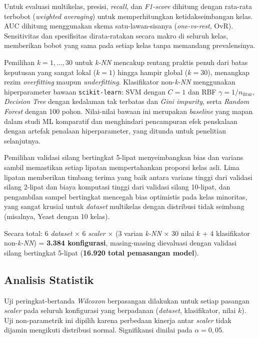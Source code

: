 \documentclass[12pt,a4paper]{article}
\begin{document}
Untuk evaluasi multikelas, presisi, \textit{recall}, dan \textit{F1-score}
dihitung dengan rata-rata terbobot (\textit{weighted averaging}) untuk
memperhitungkan ketidakseimbangan kelas. AUC dihitung menggunakan skema
satu-lawan-sisanya (\textit{one-vs-rest}, OvR). Sensitivitas dan spesifisitas
dirata-ratakan secara makro di seluruh kelas, memberikan bobot yang sama pada
setiap kelas tanpa memandang prevalensinya.

Pemilihan $k=1,\dots,30$ untuk \textit{k-NN} mencakup rentang praktis penuh
dari batas keputusan yang sangat lokal ($k=1$) hingga hampir global ($k=30$),
menangkap rezim \textit{overfitting} maupun \textit{underfitting}. Klasifikator
non-\textit{k-NN} menggunakan hiperparameter bawaan \texttt{scikit-learn}:
SVM dengan $C=1$ dan RBF $\gamma=1/n_{\text{fitur}}$, \textit{Decision Tree}
dengan kedalaman tak terbatas dan \textit{Gini impurity}, serta \textit{Random
Forest} dengan 100 pohon. Nilai-nilai bawaan ini merupakan \textit{baseline}
yang mapan dalam studi ML komparatif dan menghindari pencampuran efek
penskalaan dengan artefak penalaan hiperparameter, yang ditunda untuk
penelitian selanjutnya.

Pemilihan validasi silang bertingkat 5-lipat menyeimbangkan bias dan varians
sambil memastikan setiap lipatan mempertahankan proporsi kelas asli. Lima
lipatan memberikan timbang terima yang baik antara varians tinggi dari validasi
silang 2-lipat dan biaya komputasi tinggi dari validasi silang 10-lipat, dan
pengambilan sampel bertingkat mencegah bias optimistis pada kelas minoritas,
yang sangat krusial untuk \textit{dataset} multikelas dengan distribusi tidak
seimbang (misalnya, Yeast dengan 10 kelas).

Secara total: 6 \textit{dataset} $\times$ 6 \textit{scaler} $\times$
(3 varian \textit{k-NN} $\times$ 30 nilai $k$ + 4 klasifikator non-\textit{k-NN})
= \textbf{3.384 konfigurasi}, masing-masing dievaluasi dengan validasi silang
bertingkat 5-lipat (\textbf{16.920 total pemasangan model}).

\subsection{Analisis Statistik}
\label{sec:stats}

Uji peringkat-bertanda \textit{Wilcoxon} berpasangan
\cite{amorim2023scaling} dilakukan untuk setiap pasangan \textit{scaler} pada
seluruh konfigurasi yang berpadanan (\textit{dataset}, klasifikator, nilai $k$).
Uji non-parametrik ini dipilih karena perbedaan kinerja antar \textit{scaler}
tidak dijamin mengikuti distribusi normal. Signifikansi dinilai pada
$\alpha = 0,05$.
\end{document}
